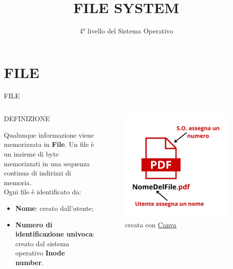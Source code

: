 \documentclass[aspectratio=1610]{beamer}
\title{FILE SYSTEM}
\subtitle{4° livello del Sistema Operativo}
\date{}
\institute{\textit{
        Fonti:
        \begin{itemize}
            \item[-] \href{https://www.unimi.it/it/corsi/laurea-triennale/informatica}{Appunti Università degli Studi di Milano}
        \end{itemize}
    }
}
\begin{document}
\begin{frame}
    \titlepage
\end{frame}

\section{FILE}

\begin{frame}{FILE}
    \begin{columns}
            \begin{alertblock}{DEFINIZIONE}
                \begin{minipage}{0.97\linewidth}
                    \justifying
                    Qualunque informazione viene memorizzata in \textbf{File}. Un file è un insieme di byte memorizzati 
                    in una sequenza continua di indirizzi di memoria.\\
                    Ogni file è identificato da:
                    \begin{itemize}
                        \item \textbf{Nome}: creato dall'utente;
                        \item \textbf{Numero di identificazione univoca}: creato dal sistema operativo \textbf{Inode number}.
                    \end{itemize}
                \end{minipage}
            \end{alertblock}
            \begin{figure}
                \includegraphics[width=\linewidth]{img/file.jpg}
                \caption{{creata con \href{https://www.canva.com/}{Canva}}}
            \end{figure}
    \end{columns}
\end{frame}
\end{document}
